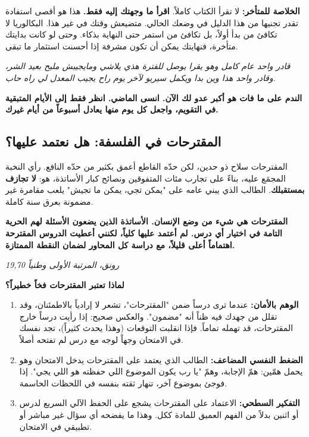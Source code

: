 \documentclass[12pt,a4paper]{book}
\newcommand{\quoteAr}[1]{%
	\begin{myquote}
		\itshape #1
	\end{myquote}
}
\newcommand{\importantAr}[1]{%
	\begin{important}
		\bfseries #1
	\end{important}
}
\begin{document}
	\textbf{الخلاصة للمتأخر:}
	لا تقرأ الكتاب كاملاً. \textbf{اقرأ ما وجهتك إليه فقط.} هذا هو أقصى استفادة تقدر تجنيها من هذا الدليل في وضعك الحالي. متضيعش وقتك في غير هذا. البكالوريا لا تكافئ من بدأ أولاً، بل تكافئ من استمر حتى النهاية بذكاء. وحتى لو كانت بدايتك متأخرة، فنهايتك يمكن أن تكون مشرفة إذا أحسنت استثمار ما تبقى.
	
	\quoteAr{قادر واحد عام كامل وهو يقرا يوصل للفترة هذي يلاشي ومايجيبش مليح بعيد الشر، وقادر واحد هذا وين بدا ويكمل سيريو لآخر يوم راح يجيب المعدل لي راه حاب.}
	
	\importantAr{الندم على ما فات هو أكبر عدو لك الآن. انسى الماضي. انظر فقط إلى الأيام المتبقية في التقويم، واجعل كل يوم منها يعادل أسبوعاً من أيام غيرك.}
	
	\subsection{المقترحات في الفلسفة: هل نعتمد عليها؟}
	
	المقترحات سلاح ذو حدين، لكن حدّه القاطع أعمق بكثير من حدّه النافع. رأي النخبة المجمَع عليه، بناءً على تجارب مئات المتفوقين ونصائح كبار الأساتذة، هو: \textbf{لا تجازف بمستقبلك}. الطالب الذي يبني عامه على "يمكن تجي، يمكن ما تجيش" يلعب مقامرة غير مضمونة بعرق سنة كاملة.
	
	\importantAr{المقترحات هي شيء من وضع الإنسان. الأساتذة الذين يضعون الأسئلة لهم الحرية التامة في اختيار أي درس. لم أعتمد عليها كلياً، لكنني أعطيت الدروس المقترحة اهتماماً أعلى قليلاً، مع دراسة كل المحاور لضمان النقطة الممتازة.}
	\textit{ رونق، المرتبة الأولى وطنياً 19,70}
	
	\textbf{لماذا تعتبر المقترحات فخاً خطيراً؟}
	\begin{enumerate}
		\item \textbf{الوهم بالأمان:} عندما ترى درساً ضمن "المقترحات"، تشعر لا إرادياً بالاطمئنان، وقد تقلل من جهدك فيه ظناً أنه "مضمون". والعكس صحيح: إذا رأيت درساً خارج المقترحات، قد تهمله تماماً. فإذا انقلبت التوقعات (وهذا يحدث كثيراً)، تجد نفسك في الامتحان وجهاً لوجه مع درس لم تفتحه أصلاً.
		\item \textbf{الضغط النفسي المضاعف:} الطالب الذي يعتمد على المقترحات يدخل الامتحان وهو يحمل همّين: همّ الإجابة، وهمّ "يا رب يكون الموضوع اللي حفظته هو اللي يجي". إذا فوجئ بموضوع آخر، تنهار ثقته بنفسه في اللحظات الحاسمة.
		\item \textbf{التفكير السطحي:} الاعتماد على المقترحات يشجع على الحفظ الآلي السريع لدرس أو اثنين بدلاً من الفهم العميق للمادة ككل. وهذا ما يفضحه أي سؤال غير مباشر أو تطبيقي في الامتحان.
	\end{enumerate}
	
\end{document}
